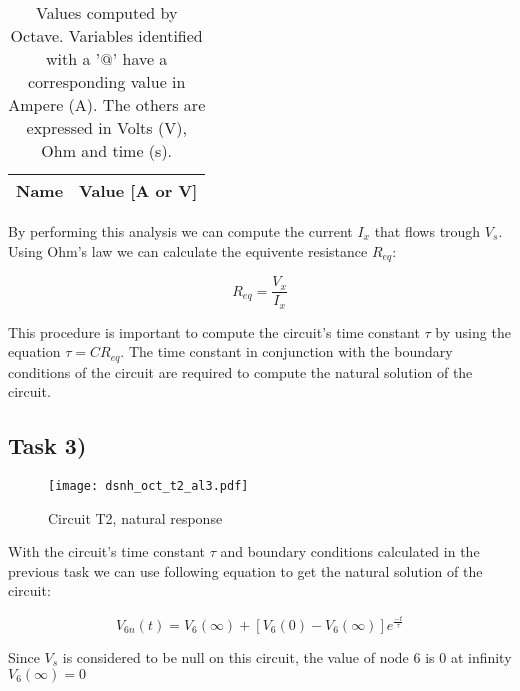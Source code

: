 \begin{table}[ht]
	\centering
	\begin{tabular}{|l|r|}
    		\hline    
    		{\bf Name} & {\bf Value [A or V]} \\ \hline
    		
  	\end{tabular}
  	\caption{Values computed by Octave. Variables identified with a '$@$' have a
  	corresponding value in Ampere (A). The others are expressed in Volts (V), Ohm and time (s).}
 
\label{tab:node}
\end{table}


By performing this analysis we can compute the current $I_x$ that flows trough $V_s$. Using Ohm's law we can calculate the equivente resistance $R_{eq}$:

\[
R_{eq}=\frac{V_x}{I_x}
\]


This procedure is important to compute the circuit's time constant $\tau$ by using the equation $\tau = CR_{eq}$. The time constant in conjunction with the boundary conditions of the circuit are required to compute the natural solution of the circuit.



\newpage
\subsection{Task 3)}
\label{subsec:task3_a}

\begin{figure}[H]
	\centering
	\texttt{[image: dsnh\_oct\_t2\_al3.pdf]}
	\caption{Circuit T2, natural response}
\label{fig:Dsnh_sim_t2}
\end{figure}

With the circuit's time constant $\tau$ and boundary conditions calculated in the previous task we can use following equation to get the natural solution of the circuit:

\[
V_{6n}(t) = V_6(\infty) + [V_6(0) - V_6(\infty)]e^{\frac{-t}{\tau}}
\] 

Since $V_s$ is considered to be null on this circuit, the value of node 6 is 0 at infinity $V_6(\infty) = 0$ 



